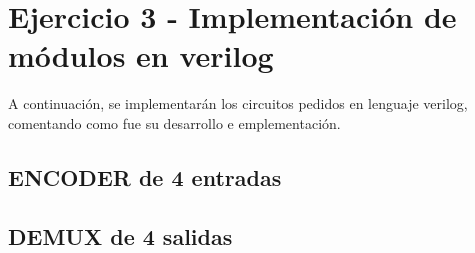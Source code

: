 \section{Ejercicio 3 - Implementación de módulos en verilog}
A continuación, se implementarán los circuitos pedidos en lenguaje verilog, comentando como fue su desarrollo e emplementación.
\subsection{ENCODER de 4 entradas}

\subsection{DEMUX de 4 salidas}
